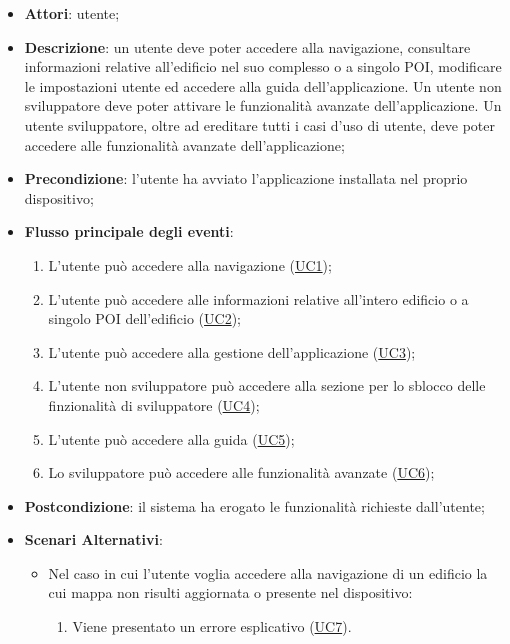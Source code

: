 \documentclass[../AnalisiDeiRequisiti.tex]{subfiles}
\begin{document}
\begin{itemize}
\item \textbf{Attori}: utente;
\item \textbf{Descrizione}: un utente deve poter accedere alla navigazione, consultare informazioni relative all'edificio nel suo complesso o a singolo POI, modificare le impostazioni utente ed accedere alla guida dell'applicazione. Un utente non sviluppatore deve poter attivare le funzionalità avanzate dell'applicazione. Un utente sviluppatore, oltre ad ereditare tutti i casi d'uso di utente, deve poter accedere alle funzionalità avanzate dell'applicazione; 
      \item \textbf{Precondizione}: l'utente ha avviato l'applicazione installata nel proprio dispositivo;

        \item \textbf{Flusso principale degli eventi}:
          \begin{enumerate}
          \item L'utente può accedere alla navigazione (\hyperlink{UC1}{UC1});
          \item L'utente può accedere alle informazioni relative all'intero edificio o a singolo POI dell'edificio (\hyperlink{UC2}{UC2});
          \item L'utente può accedere alla gestione dell'applicazione (\hyperlink{UC3}{UC3});
          \item L'utente non sviluppatore può accedere alla sezione per lo sblocco delle finzionalità di sviluppatore (\hyperlink{UC4}{UC4});
          \item L'utente può accedere alla guida (\hyperlink{UC5}{UC5});
          \item Lo sviluppatore può accedere alle funzionalità avanzate (\hyperlink{UC6}{UC6});

      \end{enumerate}
    \item \textbf{Postcondizione}: il sistema ha erogato le funzionalità richieste dall'utente;
    \item \textbf{Scenari Alternativi}:
      	\begin{itemize}
			\item Nel caso in cui l'utente voglia accedere alla navigazione di un edificio la cui mappa non risulti aggiornata o presente nel dispositivo:
			\begin{enumerate}
				\item Viene presentato un errore esplicativo (\hyperlink{UC7}{UC7}).
			\end{enumerate}
      	\end{itemize}
  \end{itemize}
\hypertarget{UC1}{}
\end{document}
